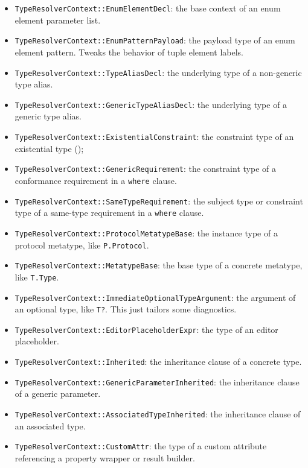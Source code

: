 \documentclass[../generics]{subfiles}
\begin{document}
\begin{itemize}
\item \texttt{TypeResolverContext::EnumElementDecl}: the base context of an enum element parameter list.
\item \texttt{TypeResolverContext::EnumPatternPayload}: the payload type of an enum element pattern. Tweaks the behavior of tuple element labels.
\item \texttt{TypeResolverContext::TypeAliasDecl}: the underlying type of a non-generic type alias.
\item \texttt{TypeResolverContext::GenericTypeAliasDecl}: the underlying type of a generic type alias.
\item \texttt{TypeResolverContext::ExistentialConstraint}: the constraint type of an existential type ();
\item \texttt{TypeResolverContext::GenericRequirement}: the constraint type of a conformance requirement in a \texttt{where} clause.
\item \texttt{TypeResolverContext::SameTypeRequirement}: the subject type or constraint type of a same-type requirement in a \texttt{where} clause.
\item \texttt{TypeResolverContext::ProtocolMetatypeBase}: the instance type of a protocol metatype, like \texttt{P.Protocol}.
\item \texttt{TypeResolverContext::MetatypeBase}: the base type of a concrete metatype, like \texttt{T.Type}.
\item \texttt{TypeResolverContext::ImmediateOptionalTypeArgument}: the argument of an optional type, like \texttt{T?}. This just tailors some diagnostics.
\item \texttt{TypeResolverContext::EditorPlaceholderExpr}: the type of an editor placeholder.
\item \texttt{TypeResolverContext::Inherited}: the inheritance clause of a concrete type.
\item \texttt{TypeResolverContext::GenericParameterInherited}: the inheritance clause of a generic parameter.
\item \texttt{TypeResolverContext::AssociatedTypeInherited}: the inheritance clause of an associated type.
\item \texttt{TypeResolverContext::CustomAttr}: the type of a custom attribute referencing a property wrapper or result builder.
\end{itemize}
\end{document}

